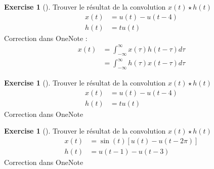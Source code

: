 \documentclass{article}
\theoremstyle{plain}%
\theoremstyle{definition}
\newtheorem{xca}[exmp]{Exercise}
\theoremstyle{remark}
\begin{document}
\begin{xca}[]
    Trouver le résultat de la convolution $ x(t) \star h(t) $ \begin{align*}
        x(t) &= u(t) - u(t-4) \\
        h(t) &= tu(t)
    \end{align*}
    Correction dans OneNote : \begin{align*}
        x(t) &= \int_{-\infty }^{\infty } x(\tau )h(t-\tau )d \tau \\
            &= \int_{-\infty }^{\infty } h(\tau )x(t-\tau )d \tau
    \end{align*}
\end{xca}

\begin{xca}[]
    Trouver le résultat de la convolution $ x(t) \star h(t) $ \begin{align*}
        x(t) &= u(t) - u(t-4) \\
        h(t) &= tu(t)
    \end{align*}
    Correction dans OneNote
\end{xca}

\begin{xca}[]
    Trouver le résultat de la convolution $ x(t) \star h(t) $ \begin{align*}
        x(t) &= \sin (t) [u(t) - u(t-2 \pi )] \\
        h(t) &= u(t-1) - u(t-3)
    \end{align*}
    Correction dans OneNote
\end{xca}
\end{document}
